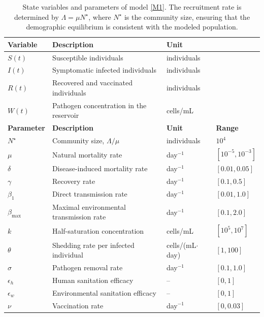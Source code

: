 \documentclass[11pt]{article}
\theoremstyle{plain}
\theoremstyle{definition}
\theoremstyle{remark}
\begin{document}
\begin{table}[!htbp]
\centering
\caption{State variables and parameters of model \eqref{M1}. The recruitment rate is determined by $\Lambda=\mu N^\star$, where $N^\star$ is the community size, ensuring that the demographic equilibrium is consistent with the modeled population.}\label{T1}
\small
\begin{tabular}{@{}llll@{}}
\toprule
\textbf{Variable} & \textbf{Description} & \textbf{Unit} & \\
\midrule
$S(t)$ & Susceptible individuals & individuals & \\
$I(t)$ & Symptomatic infected individuals & individuals & \\
$R(t)$ & Recovered and vaccinated individuals & individuals & \\
$W(t)$ & Pathogen concentration in the reservoir & cells/mL & \\
\midrule
\textbf{Parameter} & \textbf{Description} & \textbf{Unit} & \textbf{Range} \\
\midrule
$N^\star$ & Community size, $\Lambda/\mu$ & individuals & $10^4$ \\
$\mu$ & Natural mortality rate & day$^{-1}$ & $[10^{-5},10^{-3}]$ \cite{codeco2001endemic} \\
$\delta$ & Disease-induced mortality rate & day$^{-1}$ & $[0.01,0.05]$ \cite{harris2012cholera} \\
$\gamma$ & Recovery rate & day$^{-1}$ & $[0.1,0.5]$ \cite{codeco2001endemic,azman2013incubation} \\
$\beta_1$ & Direct transmission rate & day$^{-1}$ & $[0.01,1.0]$ \cite{tien2010multiple,mukandavire2011estimating} \\
$\beta_{\max}$ & Maximal environmental transmission rate & day$^{-1}$ & $[0.1,2.0]$ \cite{capasso1979mathematical} \\
$k$ & Half-saturation concentration & cells/mL & $[10^5,10^7]$ \cite{codeco2001endemic} \\
$\theta$ & Shedding rate per infected individual & cells/(mL$\cdot$day) & $[1,100]$ \cite{nelson2009transmission} \\
$\sigma$ & Pathogen removal rate & day$^{-1}$ & $[0.1,1.0]$ \cite{codeco2001endemic} \\
$\epsilon_h$ & Human sanitation efficacy & -- & $[0,1]$ \\
$\epsilon_w$ & Environmental sanitation efficacy & -- & $[0,1]$ \\
$\nu$ & Vaccination rate & day$^{-1}$ & $[0,0.03]$ \cite{azman2015impact} \\
\bottomrule
\end{tabular}
\end{table}
\end{document}
